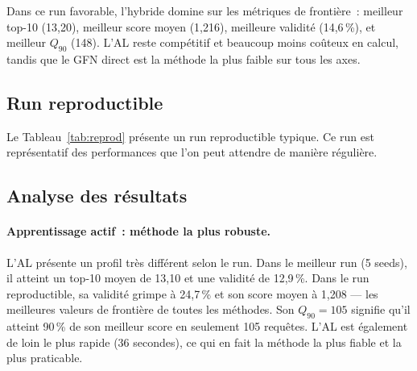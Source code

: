 \documentclass[10pt]{article}
\begin{document}
Dans ce run favorable, l'hybride domine sur les métriques de frontière~: meilleur top-10 (13,20), meilleur score moyen (1,216), meilleure validité (14,6\,\%), et meilleur $Q_{90}$ (148). L'AL reste compétitif et beaucoup moins coûteux en calcul, tandis que le GFN direct est la méthode la plus faible sur tous les axes.

\subsection{Run reproductible}
\label{ssec:reprodrun}

Le Tableau~\ref{tab:reprod} présente un run reproductible typique. Ce run est représentatif des performances que l'on peut attendre de manière régulière.

\begin{table}[h]
\centering
\small
{}
\label{tab:reprod}
\end{table}

\subsection{Analyse des résultats}

\paragraph{Apprentissage actif~: méthode la plus robuste.}
L'AL présente un profil très différent selon le run. Dans le meilleur run (5 seeds), il atteint un top-10 moyen de 13,10 et une validité de 12,9\,\%. Dans le run reproductible, sa validité grimpe à 24,7\,\% et son score moyen à 1,208 — les meilleures valeurs de frontière de toutes les méthodes. Son $Q_{90}=105$ signifie qu'il atteint 90\,\% de son meilleur score en seulement 105 requêtes. L'AL est également de loin le plus rapide (36 secondes), ce qui en fait la méthode la plus fiable et la plus praticable.
\end{document}
